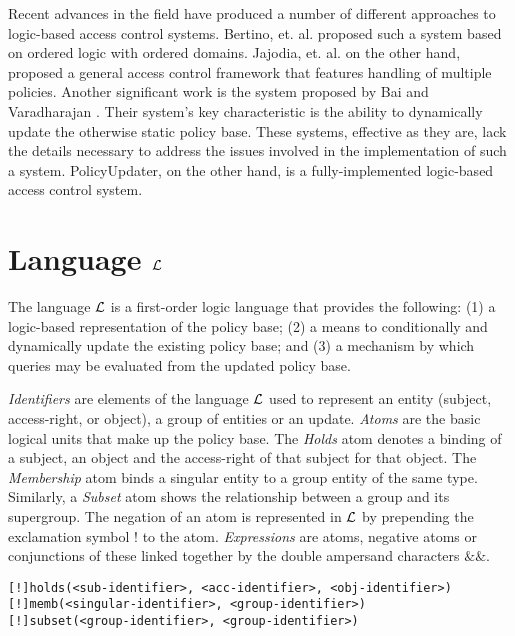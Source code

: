\documentclass{llncs}
\begin{document}
    Recent advances in the field have produced a number of different approaches
    to logic-based access control systems. Bertino, et. al. \cite{BER} proposed
    such a system based on ordered logic with ordered domains. Jajodia, et. al.
    \cite{JAJ} on the other hand, proposed a general access control framework
    that features handling of multiple policies. Another significant work is
    the system proposed by Bai and Varadharajan \cite{BAI}. Their system's key
    characteristic is the ability to dynamically update the otherwise static
    policy base. These systems, effective as they are, lack the details
    necessary to address the issues involved in the implementation of such
    a system. PolicyUpdater, on the other hand, is a fully-implemented
    logic-based access control system.

  \section{Language $\cal{L}$}

    The language $\cal{L}$ is a first-order logic language that provides the
    following:  (1) a logic-based representation of the policy base; (2) a
    means to conditionally and dynamically update the existing policy base;
    and (3) a mechanism by which queries may be evaluated from the updated
    policy base.

    \emph{Identifiers} are elements of the language $\cal{L}$ used to represent
    an entity (subject, access-right, or object), a group of entities or an
    update. \emph{Atoms} are the basic logical units that make up the
    policy base. The \emph{Holds} atom denotes a binding of a subject,
    an object and the access-right of that subject for that object.
    The \emph{Membership} atom binds a singular entity to a group entity of
    the same type. Similarly, a \emph{Subset} atom shows the relationship
    between a group and its supergroup. The negation of an atom is represented
    in $\cal{L}$ by prepending the exclamation symbol $!$ to the atom.
    \emph{Expressions} are atoms, negative atoms or conjunctions of these
    linked together by the double ampersand characters $\&\&$.

    \begin{verbatim}
[!]holds(<sub-identifier>, <acc-identifier>, <obj-identifier>)
[!]memb(<singular-identifier>, <group-identifier>)
[!]subset(<group-identifier>, <group-identifier>)
\end{verbatim}
\end{document}

